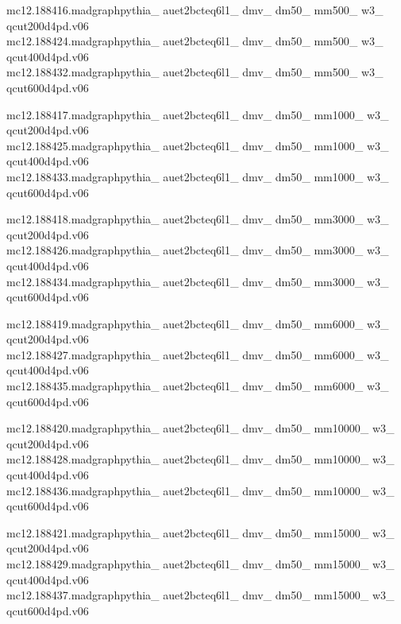 mc12.188416.madgraphpythia\_ auet2bcteq6l1\_ dmv\_ dm50\_ mm500\_ w3\_ \\ qcut200d4pd.v06\\
mc12.188424.madgraphpythia\_ auet2bcteq6l1\_ dmv\_ dm50\_ mm500\_ w3\_ \\ qcut400d4pd.v06\\
mc12.188432.madgraphpythia\_ auet2bcteq6l1\_ dmv\_ dm50\_ mm500\_ w3\_ \\ qcut600d4pd.v06

mc12.188417.madgraphpythia\_ auet2bcteq6l1\_ dmv\_ dm50\_ mm1000\_ w3\_ \\ qcut200d4pd.v06\\
mc12.188425.madgraphpythia\_ auet2bcteq6l1\_ dmv\_ dm50\_ mm1000\_ w3\_ \\ qcut400d4pd.v06\\
mc12.188433.madgraphpythia\_ auet2bcteq6l1\_ dmv\_ dm50\_ mm1000\_ w3\_ \\ qcut600d4pd.v06

mc12.188418.madgraphpythia\_ auet2bcteq6l1\_ dmv\_ dm50\_ mm3000\_ w3\_ \\ qcut200d4pd.v06\\
mc12.188426.madgraphpythia\_ auet2bcteq6l1\_ dmv\_ dm50\_ mm3000\_ w3\_ \\ qcut400d4pd.v06\\
mc12.188434.madgraphpythia\_ auet2bcteq6l1\_ dmv\_ dm50\_ mm3000\_ w3\_ \\ qcut600d4pd.v06

mc12.188419.madgraphpythia\_ auet2bcteq6l1\_ dmv\_ dm50\_ mm6000\_ w3\_ \\ qcut200d4pd.v06\\
mc12.188427.madgraphpythia\_ auet2bcteq6l1\_ dmv\_ dm50\_ mm6000\_ w3\_ \\ qcut400d4pd.v06\\
mc12.188435.madgraphpythia\_ auet2bcteq6l1\_ dmv\_ dm50\_ mm6000\_ w3\_ \\ qcut600d4pd.v06

mc12.188420.madgraphpythia\_ auet2bcteq6l1\_ dmv\_ dm50\_ mm10000\_ w3\_ \\ qcut200d4pd.v06\\
mc12.188428.madgraphpythia\_ auet2bcteq6l1\_ dmv\_ dm50\_ mm10000\_ w3\_ \\ qcut400d4pd.v06\\
mc12.188436.madgraphpythia\_ auet2bcteq6l1\_ dmv\_ dm50\_ mm10000\_ w3\_ \\ qcut600d4pd.v06

mc12.188421.madgraphpythia\_ auet2bcteq6l1\_ dmv\_ dm50\_ mm15000\_ w3\_ \\ qcut200d4pd.v06\\
mc12.188429.madgraphpythia\_ auet2bcteq6l1\_ dmv\_ dm50\_ mm15000\_ w3\_ \\ qcut400d4pd.v06\\
mc12.188437.madgraphpythia\_ auet2bcteq6l1\_ dmv\_ dm50\_ mm15000\_ w3\_ \\ qcut600d4pd.v06

